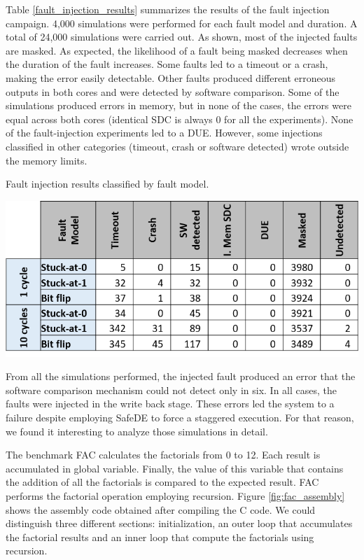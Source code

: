 Table \ref{fault_injection_results} summarizes the results of the fault injection campaign. 4,000 simulations were performed for each fault model and duration. A total of 24,000 simulations were carried out. As shown, most of the injected faults are masked. As expected, the likelihood of a fault being masked decreases when the duration of the fault increases. Some faults led to a timeout or a crash, making the error easily detectable. Other faults produced different erroneous outputs in both cores and were detected by software comparison. Some of the simulations produced errors in memory, but in none of the cases, the errors were equal across both cores (identical SDC is always 0 for all the experiments). None of the fault-injection experiments led to a DUE. However, some injections classified in other categories (timeout, crash or software detected) wrote outside the memory limits.


 \begin{table}[h]
    \caption{Fault injection results classified by fault model.}
    \label{fault_injection_results}
    \centering
    \includegraphics[width=1\columnwidth]{img/faultinjection2.png}
\end{table}
   

From all the simulations performed, the injected fault produced an error that the software comparison mechanism could not detect only in six. In all cases, the faults were injected in the write back stage. These errors led the system to a failure despite employing SafeDE to force a staggered execution. For that reason, we found it interesting to analyze those simulations in detail.


The benchmark FAC calculates the factorials from 0 to 12. Each result is accumulated in global variable. Finally, the value of this variable that contains the addition of all the factorials is compared to the expected result. FAC performs the factorial operation employing recursion. Figure \ref{fig:fac_assembly} shows the assembly code obtained after compiling the C code. We could distinguish three different sections: initialization, an outer loop that accumulates the factorial results and an inner loop that compute the factorials using recursion. 

